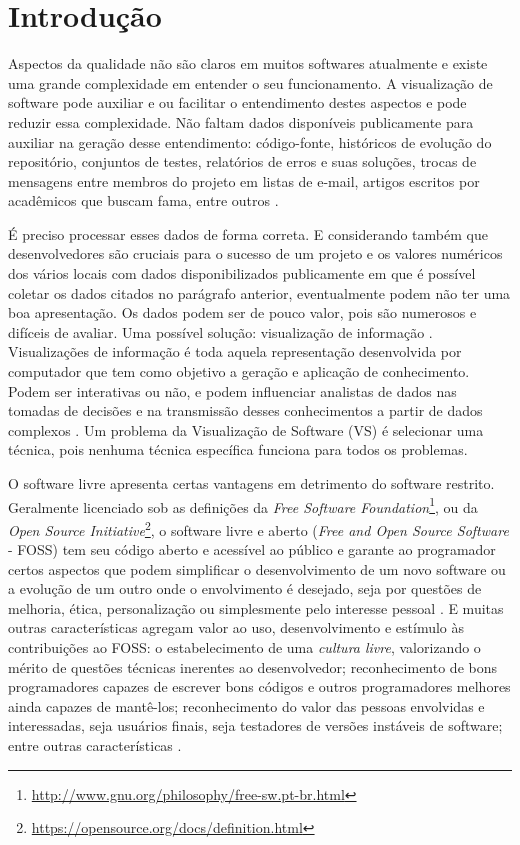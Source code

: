 \chapter{Introdução}


Aspectos da qualidade não são claros em muitos softwares atualmente e existe
uma grande complexidade em entender o seu funcionamento. A visualização de
software pode auxiliar e ou facilitar o entendimento destes aspectos e pode
reduzir essa complexidade. Não faltam dados disponíveis publicamente para
auxiliar na geração desse entendimento: código-fonte, históricos de evolução do
repositório, conjuntos de testes, relatórios de erros e suas soluções, trocas
de mensagens entre membros do projeto em listas de e-mail, artigos escritos por
acadêmicos que buscam fama, entre outros \cite{messias2012}
\cite{benkler2006wealth}.

É preciso processar esses dados de forma correta. E considerando também que
desenvolvedores são cruciais para o sucesso de um projeto e os valores
numéricos dos vários locais com dados disponibilizados publicamente em que é
possível coletar os dados citados no parágrafo anterior, eventualmente podem não ter
uma boa apresentação. Os dados podem ser de pouco valor, pois são numerosos e
difíceis de avaliar. Uma possível solução: visualização de informação
\cite{messias2012}. Visualizações de informação é toda aquela representação
desenvolvida por computador que tem como objetivo a geração e aplicação de
conhecimento. Podem ser interativas ou não, e podem influenciar analistas de
dados nas tomadas de decisões e na transmissão desses conhecimentos a partir de
dados complexos \cite{card1999readings}. Um problema da Visualização de Software
(VS) é selecionar uma técnica, pois nenhuma técnica específica funciona para
todos os problemas.

O software livre apresenta certas vantagens em detrimento do software restrito.
Geralmente licenciado sob as definições da
\textit{Free Software Foundation}\footnote{\url{http://www.gnu.org/philosophy/free-sw.pt-br.html}},
ou da \textit{Open Source Initiative}\footnote{\url{https://opensource.org/docs/definition.html}},
o software livre e aberto (\textit{Free and Open Source Software} - FOSS) tem
seu código aberto e acessível ao público e garante ao programador certos
aspectos que podem simplificar o desenvolvimento de um novo software ou a
evolução de um outro onde o envolvimento é desejado, seja por questões de
melhoria, ética, personalização ou simplesmente pelo interesse pessoal
\cite{meirelles2013monitoramento}. E muitas outras características agregam
valor ao uso, desenvolvimento e estímulo às contribuições ao FOSS: o
estabelecimento de uma \textit{cultura livre}, valorizando o mérito de questões
técnicas inerentes ao desenvolvedor; reconhecimento de bons programadores
capazes de escrever bons códigos e outros programadores melhores ainda capazes de
mantê-los; reconhecimento do valor das pessoas envolvidas e interessadas, seja
usuários finais, seja testadores de versões instáveis de software; entre outras
características \cite{raymond1999cathedral}.

